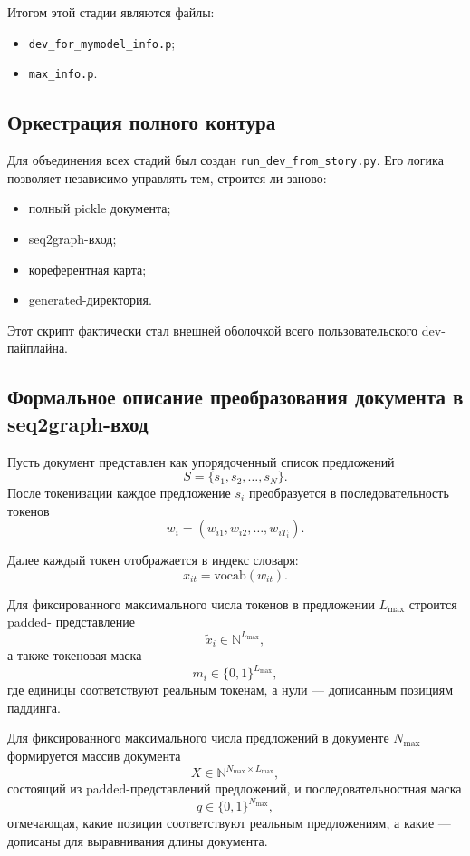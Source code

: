 \documentclass[12pt,a4paper]{article}
\begin{document}
Итогом этой стадии являются файлы:

\begin{itemize}
    \item \texttt{dev\_for\_mymodel\_info.p};
    \item \texttt{max\_info.p}.
\end{itemize}

\subsection{Оркестрация полного контура}

Для объединения всех стадий был создан \texttt{run\_dev\_from\_story.py}. Его логика
позволяет независимо управлять тем, строится ли заново:

\begin{itemize}
    \item полный pickle документа;
    \item seq2graph-вход;
    \item кореферентная карта;
    \item generated-директория.
\end{itemize}

Этот скрипт фактически стал внешней оболочкой всего пользовательского dev-пайплайна.

\subsection{Формальное описание преобразования документа в seq2graph-вход}

Пусть документ представлен как упорядоченный список предложений
\[
S = \{s_1, s_2, \dots, s_N\}.
\]
После токенизации каждое предложение $s_i$ преобразуется в последовательность токенов
\[
w_i = (w_{i1}, w_{i2}, \dots, w_{iT_i}).
\]

Далее каждый токен отображается в индекс словаря:
\[
x_{it} = \mathrm{vocab}(w_{it}).
\]

Для фиксированного максимального числа токенов в предложении $L_{\max}$ строится padded-
представление
\[
\tilde{x}_i \in \mathbb{N}^{L_{\max}},
\]
а также токеновая маска
\[
m_i \in \{0,1\}^{L_{\max}},
\]
где единицы соответствуют реальным токенам, а нули --- дописанным позициям паддинга.

Для фиксированного максимального числа предложений в документе $N_{\max}$ формируется
массив документа
\[
X \in \mathbb{N}^{N_{\max} \times L_{\max}},
\]
состоящий из padded-представлений предложений, и последовательностная маска
\[
q \in \{0,1\}^{N_{\max}},
\]
отмечающая, какие позиции соответствуют реальным предложениям, а какие --- дописаны для
выравнивания длины документа.
\end{document}
